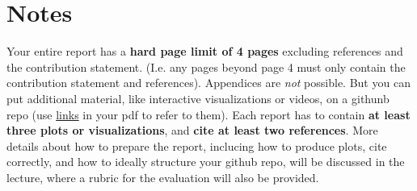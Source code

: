 \documentclass{article}
\begin{document}
\section*{Notes} 

Your entire report has a \textbf{hard page limit of 4 pages} excluding references and the contribution statement. (I.e. any pages beyond page 4 must only contain the contribution statement and references). Appendices are \emph{not} possible. But you can put additional material, like interactive visualizations or videos, on a githunb repo (use \href{https://github.com/pnkraemer/tueplots}{links} in your pdf to refer to them). Each report has to contain \textbf{at least three plots or visualizations}, and \textbf{cite at least two references}. More details about how to prepare the report, inclucing how to produce plots, cite correctly, and how to ideally structure your github repo, will be discussed in the lecture, where a rubric for the evaluation will also be provided.




\end{document}
